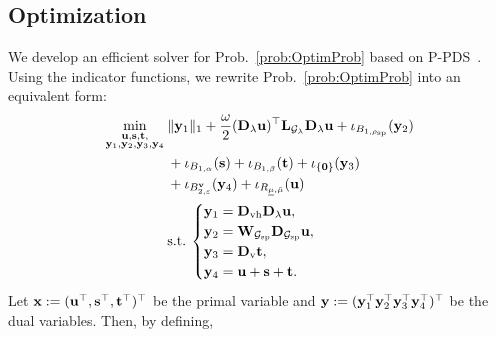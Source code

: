 


% 
% 
\subsection{Optimization}
\label{subsec:Optim}
We develop an efficient solver for Prob.~\eqref{prob:OptimProb} based on P-PDS~\cite{Pock2011PPDS}.
Using the indicator functions, we rewrite Prob.~\eqref{prob:OptimProb} into an equivalent form:
\begin{align}
    \label{prob:OptimProb2PPDS}
    \min_{
    \substack{
        \mathbf{u}, \mathbf{s}, \mathbf{t}, \\
        \mathbf{y}_{1}, \mathbf{y}_{2}, \mathbf{y}_{3}, \mathbf{y}_{4}}} \:
    & \|\mathbf{y}_{1} \|_{1} + \frac{\omega}{2} (\mathbf{D}_{\lambda} \mathbf{u})^{\top} \mathbf{L}_{\mathcal{G}_{\lambda}} \mathbf{D}_{\lambda} \mathbf{u} + \iota_{B_{1, \rho_{\text{sp}}}} (\mathbf{y}_{2}) \notag \\
    & + \iota_{B_{1, \alpha}} (\mathbf{s}) + \iota_{B_{1, \beta}} (\mathbf{t}) + \iota_{\{ \mathbf{0} \}} (\mathbf{y}_{3}) \notag \\
    & + \iota_{B_{2, \varepsilon}^{\mathbf{v}}} (\mathbf{y}_{4}) + \iota_{R_{\underline{\mu},\bar{\mu}}} (\mathbf{u}) \notag \\
    & \mathrm{s.t.} \:
    \begin{cases} 
    \mathbf{y}_{1} = \mathbf{D}_{\text{vh}} \mathbf{D}_{\lambda} \mathbf{u}, \\
    \mathbf{y}_{2} = \mathbf{W}_{\mathcal{G}_{\text{sp}}} \mathbf{D}_{\mathcal{G}_{\text{sp}}} \mathbf{u}, \\
    \mathbf{y}_{3} = \mathbf{D}_{\text{v}} \mathbf{t}, \\
    \mathbf{y}_{4} = \mathbf{u} + \mathbf{s} + \mathbf{t}. \\
    \end{cases}
\end{align}
Let $\mathbf{x} := (\mathbf{u}^{\top}, \mathbf{s}^{\top}, \mathbf{t}^{\top})^{\top}$ be the primal variable and $\mathbf{y} := (\mathbf{y}_{1}^{\top} \mathbf{y}_{2}^{\top} \mathbf{y}_{3}^{\top} \mathbf{y}_{4}^{\top})^{\top}$ be the dual variables. Then, by defining,
